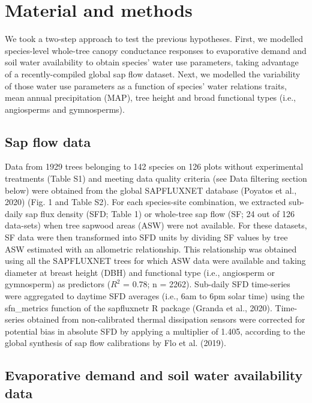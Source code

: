 \documentclass[11pt,twoside]{reedthesis}
\begin{document}
\section{Material and methods}\label{material-and-methods}

We took a two-step approach to test the previous hypotheses. First, we
modelled species-level whole-tree canopy conductance responses to
evaporative demand and soil water availability to obtain species' water
use parameters, taking advantage of a recently-compiled global sap flow
dataset. Next, we modelled the variability of those water use parameters
as a function of species' water relations traits, mean annual
precipitation (MAP), tree height and broad functional types (i.e.,
angiosperms and gymnosperms).\par

\subsection{Sap flow data}\label{sap-flow-data}

Data from 1929 trees belonging to 142 species on 126 plots without
experimental treatments (Table S1) and meeting data quality criteria
(see Data filtering section below) were obtained from the global
SAPFLUXNET database (Poyatos et al., 2020) (Fig. 1 and Table S2). For
each species-site combination, we extracted sub-daily sap flux density
(SFD; Table 1) or whole-tree sap flow (SF; 24 out of 126 data-sets) when
tree sapwood areas (ASW) were not available. For these datasets, SF data
were then transformed into SFD units by dividing SF values by tree ASW
estimated with an allometric relationship. This relationship was
obtained using all the SAPFLUXNET trees for which ASW data were
available and taking diameter at breast height (DBH) and functional type
(i.e., angiosperm or gymnosperm) as predictors (\(R^2\) = 0.78; n =
2262). Sub-daily SFD time-series were aggregated to daytime SFD averages
(i.e., 6am to 6pm solar time) using the sfn\_metrics function of the
sapfluxnetr R package (Granda et al., 2020). Time-series obtained from
non-calibrated thermal dissipation sensors were corrected for potential
bias in absolute SFD by applying a multiplier of 1.405, according to the
global synthesis of sap flow calibrations by Flo et al. (2019).\par

\subsection{Evaporative demand and soil water availability
data}\label{evaporative-demand-and-soil-water-availability-data}
\end{document}
